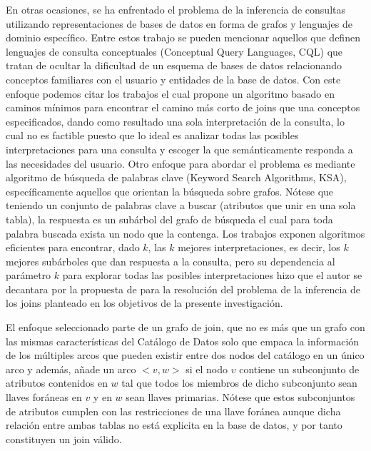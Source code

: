 En otras ocasiones, se ha enfrentado el problema de la inferencia de consultas utilizando representaciones
de bases de datos en forma de grafos y lenguajes 
de dominio específico. Entre estos trabajo se pueden mencionar aquellos que definen lenguajes de consulta 
conceptuales (Conceptual Query Languages, CQL) que tratan de ocultar la dificultad de un esquema de bases de 
datos relacionando conceptos familiares con el usuario y entidades de la base de datos. Con este enfoque 
podemos citar los trabajos \cite{owei2001enriching} el cual propone
un algoritmo basado en caminos mínimos para encontrar el camino m\'as corto de joins que una conceptos 
especificados, dando como resultado una sola interpretación de la consulta, lo cual no es factible 
puesto que lo ideal es analizar todas las posibles interpretaciones para una consulta y escoger la 
que sem\'anticamente responda a las necesidades del usuario. Otro enfoque para abordar el problema 
es mediante algoritmo de búsqueda de palabras clave (Keyword Search Algorithms, KSA), específicamente  
aquellos que orientan la búsqueda sobre grafos. Nótese que teniendo un conjunto de palabras clave 
a buscar (atributos que unir en una sola tabla), la respuesta es un sub\'arbol del grafo de búsqueda 
el cual para toda palabra buscada exista un nodo que la contenga. Los trabajos 
\cite{kimelfeld2006finding,hristidis2003efficient,he2007blinks} exponen algoritmos eficientes para 
encontrar, dado $k$, las $k$ mejores interpretaciones, es decir, los $k$ mejores sub\'arboles que dan respuesta 
a la consulta, pero su dependencia al parámetro $k$ para explorar todas las posibles interpretaciones 
hizo que el autor se decantara por la propuesta de \cite{mason2005autojoin} para la resolución 
del problema de la inferencia de los joins planteado en los objetivos de la presente investigación.

El enfoque seleccionado parte de un grafo de join, que no es m\'as que un grafo con las mismas características 
del Catálogo de Datos solo que empaca la información de los múltiples arcos que pueden existir entre 
dos nodos del catálogo en un \'unico arco y además, añade un arco $<v, w>$ si el nodo $v$ contiene un subconjunto 
de atributos contenidos en $w$ tal que todos los miembros de dicho subconjunto sean llaves for\'aneas en $v$
y en $w$ sean llaves primarias. Nótese que estos subconjuntos de atributos cumplen con las restricciones 
de una llave for\'anea aunque dicha relación entre ambas tablas no est\'a explicita en la base de datos, 
y por tanto constituyen un join válido.


